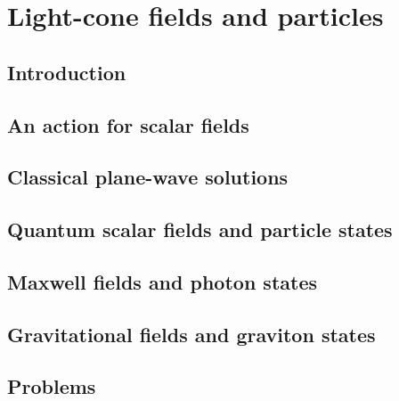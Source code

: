 \documentclass[12pt]{report}
\begin{document}
\chapter{Light-cone fields and particles}
\newpage
\section{Introduction}
\section{An action for scalar fields}
\section{Classical plane-wave solutions}
\section{Quantum scalar fields and particle states}
\section{Maxwell fields and photon states}
\section{Gravitational fields and graviton states}
\section{Problems}
\end{document}

